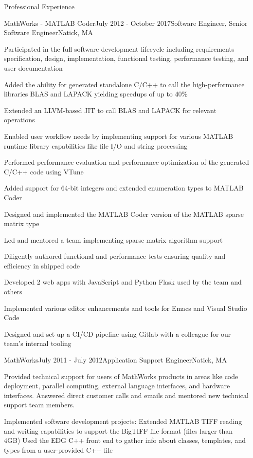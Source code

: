 \documentclass[
	usletter %
	10pt, %
]{resume} %
\begin{document}
\begin{rSection}{Professional Experience}
	\begin{rSubsection}{MathWorks - MATLAB Coder}{July 2012 - October 2017}{Software Engineer, Senior Software Engineer}{Natick, MA}
		\item Participated in the full software development lifecycle including requirements specification, design, implementation, functional testing, performance testing, and user documentation
		\item Added the ability for generated standalone C/C++ to call the high-performance libraries BLAS and LAPACK yielding speedups of up to 40\%
		\item Extended an LLVM-based JIT to call BLAS and LAPACK for relevant operations
		\item Enabled user workflow needs by implementing support for various MATLAB runtime library capabilities like file I/O and string processing
		\item Performed performance evaluation and performance optimization of the generated C/C++ code using VTune
		\item Added support for 64-bit integers and extended enumeration types to MATLAB Coder
		\item Designed and implemented the MATLAB Coder version of the MATLAB sparse matrix type
		\item Led and mentored a team implementing sparse matrix algorithm support
		\item Diligently authored functional and performance tests ensuring quality and efficiency in shipped code
		\item Developed 2 web apps with JavaScript and Python Flask used by the team and others
		\item Implemented various editor enhancements and tools for Emacs and Visual Studio Code
		\item Designed and set up a CI/CD pipeline using Gitlab with a colleague for our team's internal tooling
	\end{rSubsection}


	\begin{rSubsection}{MathWorks}{July 2011 - July 2012}{Application Support Engineer}{Natick, MA}
		\item Provided technical support for users of MathWorks products in areas like code deployment, parallel computing, external language interfaces, and hardware interfaces. Answered direct customer calls and emails and mentored new technical support team members.
		\item Implemented software development projects:
		\subitem Extended MATLAB TIFF reading and writing capabilities to support the BigTIFF file format (files larger than 4GB)
		\subitem Used the EDG C++ front end to gather info about classes, templates, and types from a user-provided C++ file
	\end{rSubsection}

\end{rSection}
\end{document}

